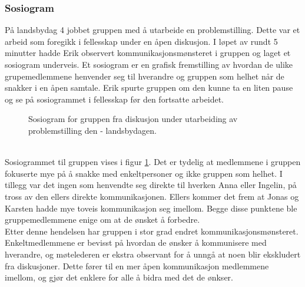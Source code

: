 \subsubsection{Sosiogram}

På landsbydag 4 jobbet gruppen med å utarbeide en problemstilling.
Dette var et arbeid som foregikk i fellesskap under en åpen diskusjon.
I løpet av rundt 5 minutter hadde Erik observert kommunikasjonsmønsteret i gruppen og laget et sosiogram underveis.
Et sosiogram er en grafisk fremstilling av hvordan de ulike grupemedlemmene henvender seg til hverandre og gruppen som helhet når de snakker i en åpen samtale.
Erik spurte gruppen om den kunne ta en liten pause og se på sosiogrammet i fellesskap før den fortsatte arbeidet.
\\
\begin{figure}
\label{fig:sosiogram}
\caption{Sosiogram for gruppen fra diskusjon under utarbeiding av problemstilling den - landsbydagen.}
\begin{center}
\end{center}
\end{figure}
\\
Sosiogrammet til gruppen vises i figur \ref{fig:sosiogram}. Det er tydelig at medlemmene i gruppen fokuserte mye på å snakke med enkeltpersoner og ikke gruppen som helhet.
I tillegg var det ingen som henvendte seg direkte til hverken Anna eller Ingelin, på tross av den ellers direkte kommunikasjonen.
Ellers kommer det frem at Jonas og Karsten hadde mye toveis kommunikasjon seg imellom.
Begge disse punktene ble gruppemedlemmene enige om at de ønsket å forbedre.
\\
Etter denne hendelsen har gruppen i stor grad endret kommunikasjonsmønsteret.
Enkeltmedlemmene er bevisst på hvordan de ønsker å kommunisere med hverandre, og møtelederen er ekstra observant for å unngå at noen blir ekskludert fra diskusjoner.
Dette fører til en mer åpen kommunikasjon medlemmene imellom, og gjør det enklere for alle å bidra med det de ønkser.
\\